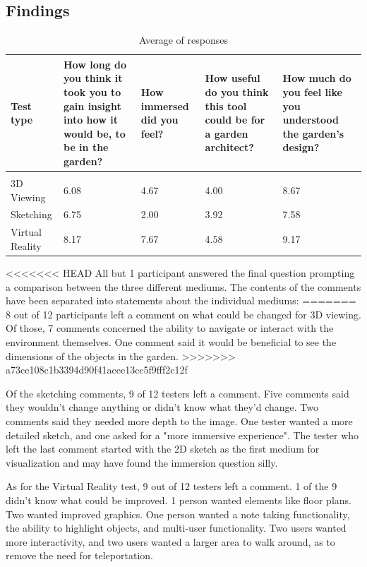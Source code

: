 \subsection{Findings}
\begin{table}[H]
	\centering
	\caption{Average of responses}
	\label{table:averageResponse}
	\begin{tabular}{p{3cm}|p{3cm}|p{2cm}|p{3cm}|p{3cm}}
		Test type       & How long do you think it took you to gain insight into how it would be, to be in the garden? & How immersed did you feel? & How useful do you think this tool could be for a garden architect? & How much do you feel like you understood the garden's design? \\ \hline
		&&&&\\
		3D Viewing      & 6.08  & 4.67  & 4.00    & 8.67               \\
		Sketching       & 6.75    & 2.00    & 3.92      & 7.58            \\
		Virtual Reality & 8.17     & 7.67     & 4.58      & 9.17    
	\end{tabular}
\end{table}

<<<<<<< HEAD
All but 1 participant answered the final question prompting a comparison between the three different mediums. 
The contents of the comments have been separated into statements about the individual mediums:
=======
8 out of 12 participants left a comment on what could be changed for 3D viewing. Of those, 7 comments concerned the ability to navigate or interact with the environment themselves. One comment said it would be beneficial to see the dimensions of the objects in the garden.
>>>>>>> a73ce108c1b3394d90f41acee13cc5f9fff2c12f

Of the sketching comments, 9 of 12 testers left a comment. Five comments said they wouldn't change anything or didn't know what they'd change. Two comments said they needed more depth to the image. One tester wanted a more detailed sketch, and one asked for a "more immersive experience". The tester who left the last comment started with the 2D sketch as the first medium for visualization and may have found the immersion question silly. 

As for the Virtual Reality test, 9 out of 12 testers left a comment. 1 of the 9 didn't know what could be improved. 1 person wanted elements like floor plans. Two wanted improved graphics. One person wanted a note taking functionality, the ability to highlight objects, and multi-user functionality. Two users wanted more interactivity, and two users wanted a larger area to walk around, as to remove the need for teleportation.

